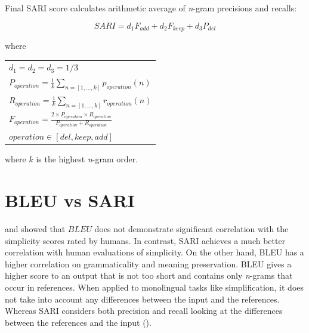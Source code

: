 \bigskip
Final SARI score calculates arithmetic average of \textit{n}-gram precisions and recalls:

\begin{equation}
SARI=d_{1} F_{add}+d_{2} F_{keep}+d_{3} P_{del}
\end{equation}

where 

\setlength\extrarowheight{12pt}
\hspace*{3em}
\begin{tabular}{l}
$d_{1}=d_{2}=d_{3}=1/3$ \\
$P_{operation}=\frac{1}{k} \sum_{n=[1, \ldots, k]} p_{operation}(n)$ \\
$R_{operation}=\frac{1}{k} \sum_{n=[1, \ldots, k]} r_{operation}(n)$ \\
$F_{operation}=\frac{2 \times P_{operation} \times R_{operation}}{P_{operation}+R_{operation}}$ \\
$operation \in[del, keep,add]$
\end{tabular}
\setlength\extrarowheight{0pt}

\bigskip
where $k$ is the highest \textit{n}-gram order.

\section{BLEU vs SARI}

\cite{xu-etal-2016-optimizing} and \cite{wubben-etal-2012-sentence} showed that $BLEU$ does not demonstrate significant correlation with the simplicity scores rated by humans. In contrast, SARI achieves a much better correlation with human evaluations of simplicity. On the other hand, BLEU has a higher correlation on grammaticality and meaning preservation. BLEU gives a higher score to an output that is not too short and contains only \textit{n}-grams that occur in references. When applied to monolingual tasks like simplification, it does not take into account any differences between the input and the references. Whereas SARI considers both precision and recall looking at the differences between the references and the input (\cite{xu-etal-2016-optimizing}).

